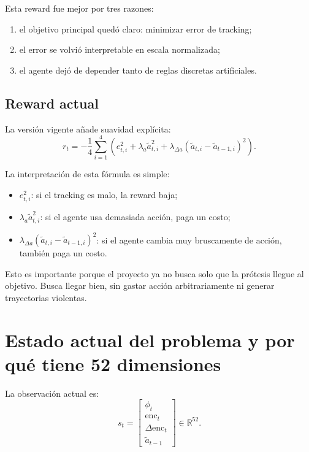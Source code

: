 \documentclass[11pt,a4paper]{article}
\begin{document}
Esta reward fue mejor por tres razones:
\begin{enumerate}[leftmargin=1.2cm]
    \item el objetivo principal qued\'o claro: minimizar error de tracking;
    \item el error se volvi\'o interpretable en escala normalizada;
    \item el agente dej\'o de depender tanto de reglas discretas artificiales.
\end{enumerate}

\subsection{Reward actual}

La versi\'on vigente a\~nade suavidad expl\'icita:
\begin{equation}
r_t =
-
\frac{1}{4}\sum_{i=1}^{4}
\left(
e_{t,i}^{2}
+
\lambda_a \tilde{a}_{t,i}^{2}
+
\lambda_{\Delta a}\left(\tilde{a}_{t,i} - \tilde{a}_{t-1,i}\right)^2
\right).
\label{eq:guide-reward}
\end{equation}

La interpretaci\'on de esta f\'ormula es simple:
\begin{itemize}[leftmargin=1.2cm]
    \item \(e_{t,i}^{2}\): si el tracking es malo, la reward baja;
    \item \(\lambda_a \tilde{a}_{t,i}^{2}\): si el agente usa demasiada acci\'on, paga un costo;
    \item \(\lambda_{\Delta a}(\tilde{a}_{t,i}-\tilde{a}_{t-1,i})^2\): si el agente cambia muy bruscamente de acci\'on, tambi\'en paga un costo.
\end{itemize}

Esto es importante porque el proyecto ya no busca solo que la pr\'otesis llegue al objetivo. Busca llegar bien, sin gastar acci\'on arbitrariamente ni generar trayectorias violentas.

\section{Estado actual del problema y por qu\'e tiene 52 dimensiones}

La observaci\'on actual es:
\begin{equation}
s_t =
\begin{bmatrix}
\phi_t \\
\mathrm{enc}_t \\
\Delta \mathrm{enc}_t \\
\tilde{a}_{t-1}
\end{bmatrix}
\in \mathbb{R}^{52}.
\label{eq:guide-state}
\end{equation}
\end{document}

